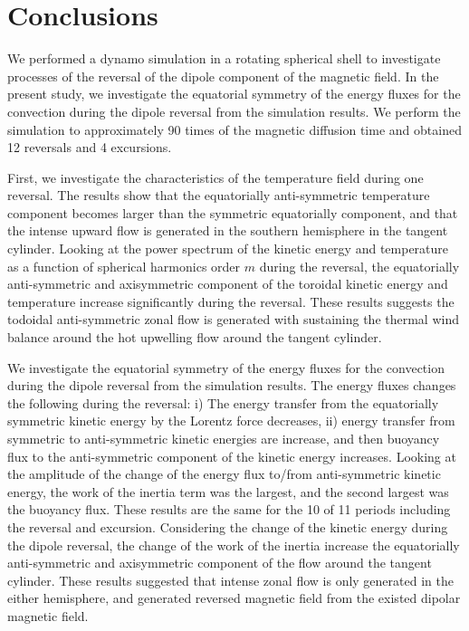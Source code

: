 \section{Conclusions}
\label{section:conclusion}

We performed a dynamo simulation in a rotating spherical shell to investigate processes of the reversal of the dipole component of the magnetic field. 
In the present study, we investigate the equatorial symmetry of the energy fluxes for the convection during the dipole reversal from the simulation results. 
We perform the simulation to approximately 90 times of the magnetic diffusion time and obtained 12 reversals and 4 excursions.

First, we investigate the characteristics of the temperature field during one reversal. 
The results show that the equatorially anti-symmetric temperature component becomes larger than the symmetric equatorially component, and that the intense upward flow is generated in the southern hemisphere in the tangent cylinder. 
Looking at the power spectrum of the kinetic energy and temperature as a function of spherical harmonics order $m$ during the reversal, the equatorially anti-symmetric and axisymmetric component of the toroidal kinetic energy and temperature increase significantly during the reversal. 
These results suggests the todoidal anti-symmetric zonal flow is generated with sustaining the thermal wind balance around the hot upwelling flow around the tangent cylinder.

We investigate the equatorial symmetry of the energy fluxes for the convection during the dipole reversal from the simulation results. 
The energy fluxes changes the following during the reversal: i) The energy transfer from the equatorially symmetric kinetic energy by the Lorentz force decreases, ii) energy transfer from symmetric to anti-symmetric kinetic energies are increase, and then buoyancy flux to the anti-symmetric component of the kinetic energy increases. 
Looking at the amplitude of the change of the energy flux to/from anti-symmetric kinetic energy, the work of the inertia term was the largest, and the second largest was the buoyancy flux. 
These results are the same for the 10 of 11 periods including the reversal and excursion. 
Considering the change of the kinetic energy during the dipole reversal, the change of the work of the inertia increase the equatorially anti-symmetric and axisymmetric component of the flow around the tangent cylinder. 
These results suggested that intense zonal flow is only generated in the either hemisphere, and generated reversed magnetic field from the existed dipolar magnetic field.